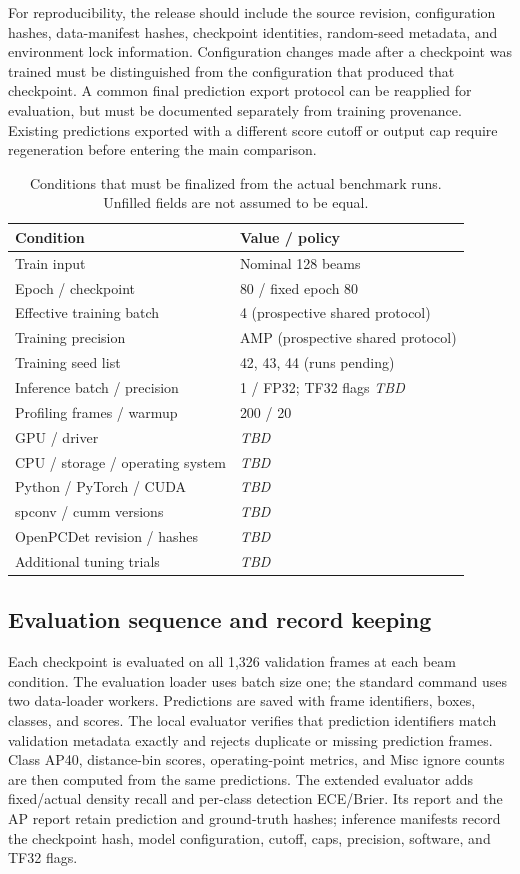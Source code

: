 \documentclass[10pt,twocolumn]{article}
\newcommand{\TBD}{\textit{TBD}}
\begin{document}
For reproducibility, the release should include the source revision, configuration hashes, data-manifest hashes, checkpoint identities, random-seed metadata, and environment lock information. Configuration changes made after a checkpoint was trained must be distinguished from the configuration that produced that checkpoint. A common final prediction export protocol can be reapplied for evaluation, but must be documented separately from training provenance. Existing predictions exported with a different score cutoff or output cap require regeneration before entering the main comparison.

\begin{table}[t]
\centering\small
\caption{Conditions that must be finalized from the actual benchmark runs. Unfilled fields are not assumed to be equal.}
\label{tab:environment}
\begin{tabular}{p{}p{}}
\toprule
Condition & Value / policy\\
\midrule
Train input & Nominal 128 beams\\
Epoch / checkpoint & 80 / fixed epoch 80\\
Effective training batch & 4 (prospective shared protocol)\\
Training precision & AMP (prospective shared protocol)\\
Training seed list & 42, 43, 44 (runs pending)\\
Inference batch / precision & 1 / FP32; TF32 flags \TBD\\
Profiling frames / warmup & 200 / 20\\
GPU / driver & \TBD\\
CPU / storage / operating system & \TBD\\
Python / PyTorch / CUDA & \TBD\\
spconv / cumm versions & \TBD\\
OpenPCDet revision / hashes & \TBD\\
Additional tuning trials & \TBD\\
\bottomrule
\end{tabular}
\end{table}

\subsection{Evaluation sequence and record keeping}
Each checkpoint is evaluated on all 1,326 validation frames at each beam condition. The evaluation loader uses batch size one; the standard command uses two data-loader workers. Predictions are saved with frame identifiers, boxes, classes, and scores. The local evaluator verifies that prediction identifiers match validation metadata exactly and rejects duplicate or missing prediction frames. Class AP40, distance-bin scores, operating-point metrics, and Misc ignore counts are then computed from the same predictions. The extended evaluator adds fixed/actual density recall and per-class detection ECE/Brier. Its report and the AP report retain prediction and ground-truth hashes; inference manifests record the checkpoint hash, model configuration, cutoff, caps, precision, software, and TF32 flags.
\end{document}
